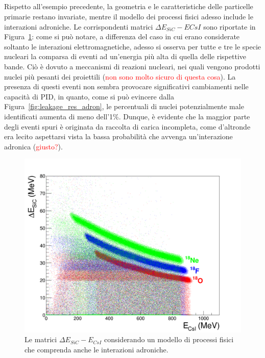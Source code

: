 
\subsection{} \label{par:interazioni_adroniche}






Rispetto all'esempio precedente, la geometria e le caratteristiche delle particelle primarie restano invariate, mentre il modello dei processi fisici adesso include le interazioni adroniche. 
Le corrispondenti matrici $\Delta E_{SiC} - E{CsI}$ sono riportate in Figura~\ref{fig:deltaE_ERes_adron}: come si può notare, a differenza del caso in cui erano considerate soltanto le interazioni elettromagnetiche, adesso si osserva per tutte e tre le specie nucleari la comparsa di eventi ad un'energia più alta di quella delle rispettive bande.
Ciò è dovuto a meccanismi di reazioni nucleari, nei quali vengono prodotti nuclei più pesanti dei proiettili (\textcolor{red}{non sono molto sicuro di questa cosa}).
La presenza di questi eventi non sembra provocare significativi cambiamenti nelle capacità di PID, in quanto, come si può evincere dalla Figura~\ref{fig:leakage_res_adron}, le percentuali di nuclei potenzialmente male identificati aumenta di meno dell'1\%. 
Dunque, è evidente che la maggior parte degli eventi spuri è originata da raccolta di carica incompleta, come d'altronde era lecito aspettarsi vista la bassa probabilità che avvenga un'interazione adronica (\textcolor{red}{giusto?}).


\begin{figure} [!t]
	\centering
	\includegraphics[width=\textwidth, keepaspectratio]{Grafici_Tesi/Interazioni_adroniche/deltaE_ERes.png}
	\caption{Le matrici $\Delta E_{SiC} - E_{CsI}$ considerando un modello di processi fisici che comprenda anche le interazioni adroniche.} \label{fig:deltaE_ERes_adron}
\end{figure}




